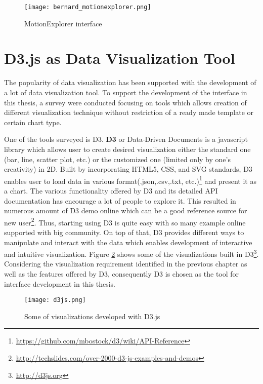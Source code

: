 \begin{figure}
\centering
\texttt{[image: bernard\_motionexplorer.png]}
\caption{MotionExplorer interface}
\label{motion_explorer}
\end{figure}

\section{D3.js as Data Visualization Tool}

The popularity of data visualization has been supported with the development of a lot of data visualization tool. To support the development of the interface in this thesis, a survey were conducted focusing on tools which allows creation of different visualization technique without restriction of a ready made template or certain chart type. 

One of the tools surveyed is D3\cite{bostock}. \textbf{D3} or Data-Driven Documents is a javascript library which allows user to create desired visualization either the standard one (bar, line, scatter plot, etc.) or the customized one (limited only by one's creativity) in 2D. Built by incorporating HTML5, CSS, and SVG standards, D3 enables user to load data in various format(.json,.csv,.txt, etc.)\footnote{\url{https://github.com/mbostock/d3/wiki/API-Reference}} and present it as a chart. The various functionality offered by D3 and its detailed API documentation has encourage a lot of people to explore it. This resulted in numerous amount of D3 demo online which can be a good reference source for new user\footnote{\url{http://techslides.com/over-2000-d3-js-examples-and-demos}}. Thus, starting using D3 is quite easy with so many example online supported with big community. On top of that, D3 provides different ways to manipulate and interact with the data which enables development of interactive and intuitive visualization. Figure \ref{d3_example} shows some of the visualizations built in D3\footnote{\url{http://d3js.org}}. Considering the visualization requirement identified in the previous chapter as well as the features offered by D3, consequently D3 is chosen as the tool for interface development in this thesis.

\begin{figure}
\centering
\texttt{[image: d3js.png]}
\caption{Some of visualizations developed with D3.js}
\label{d3_example}
\end{figure}










